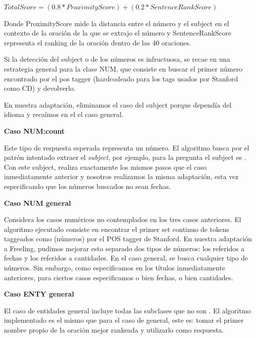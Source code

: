 $TotalScore = (0.8 * ProximityScore) + (0.2 * SentenceRankScore)$ \newline

Donde ProximityScore mide la distancia entre el número y el subject en el contexto de la oración de la que se extrajo el número y SentenceRankScore representa el ranking de la oración dentro de las 40 oraciones.

Si la detección del subject o de los números es infructuosa, se recae en una estrategia general para la clase NUM, que consiste en buscar el primer número encontrado por el pos tagger (hardcodeado para los tags usados por Stanford como CD) y devolverlo.

En nuestra adaptación, eliminamos el caso del subject porque dependía del idioma y recaímos en el el caso general. \newline

\textbf{Caso NUM:count} \newline

Este tipo de respuesta esperada representa un número. El algoritmo busca por el patrón  intentado extraer el \textit{subject}, por ejemplo, para la pregunta  el subject es . Con este subject, realiza exactamente los mismos pasos que el caso inmediatamente anterior y nosotros realizamos la misma adaptación, esta vez especificando que los números buscados no sean fechas. \newline


\textbf{Caso NUM general} \newline

Considera los casos numéricos no contemplados en los tres casos anteriores. El algoritmo ejecutado consiste en encontrar el primer set continuo de tokens taggeados como  (números) por el POS tagger de Stanford. En nuestra adaptación a Freeling, pudimos mejorar esto separado dos tipos de números: los referidos a fechas y los referidos a cantidades. En el caso general, se busca cualquier tipo de números. Sin embargo, como especificamos en los títulos inmediatamente anteriores, para ciertos casos especificamos o bien fechas, o bien cantidades. \newline

\textbf{Caso ENTY general} \newline

El caso de entidades general incluye todas las subclases que no son . El algoritmo implementado es el mismo que para el caso de  general, este es: tomar el primer nombre propio de la oración mejor rankeada y utilizarlo como respuesta. \newline


